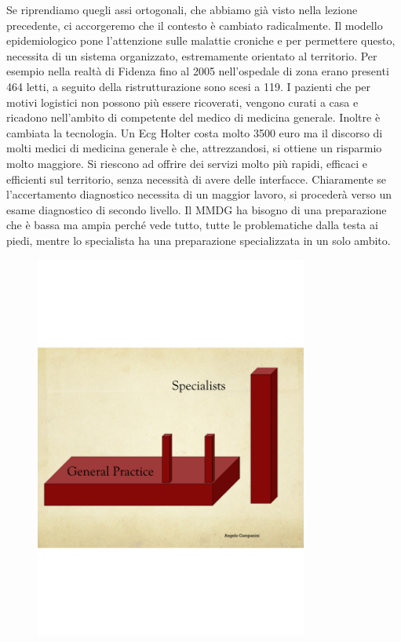 Se riprendiamo quegli assi ortogonali, che abbiamo già visto nella
lezione precedente, ci accorgeremo che il contesto è cambiato
radicalmente. Il modello epidemiologico pone l'attenzione sulle malattie
croniche e per permettere questo, necessita di un sistema organizzato,
estremamente orientato al territorio. Per esempio nella realtà di
Fidenza fino al 2005 nell'ospedale di zona erano presenti 464 letti, a
seguito della ristrutturazione sono scesi a 119. I pazienti che per
motivi logistici non possono più essere ricoverati, vengono curati a
casa e ricadono nell'ambito di competente del medico di medicina
generale. Inoltre è cambiata la tecnologia. Un Ecg Holter costa molto
3500 euro ma il discorso di molti medici di medicina generale è che,
attrezzandosi, si ottiene un risparmio molto maggiore. Si riescono ad
offrire dei servizi molto più rapidi, efficaci e efficienti sul
territorio, senza necessità di avere delle interfacce. Chiaramente se
l'accertamento diagnostico necessita di un maggior lavoro, si procederà
verso un esame diagnostico di secondo livello. Il MMDG ha bisogno di una
preparazione che è bassa ma ampia perché vede tutto, tutte le
problematiche dalla testa ai piedi, mentre lo specialista ha una
preparazione specializzata in un solo ambito.

\begin{figure}[!ht]
\centering
	\includegraphics[width=0.8\textwidth]{38/image10.png}
	\end{figure}
	
